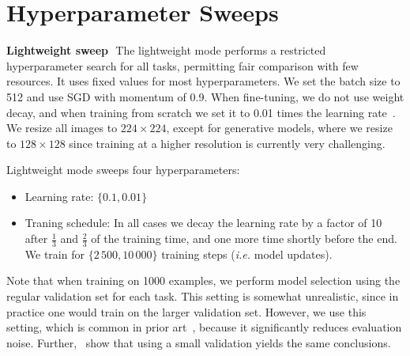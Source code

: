 \documentclass{article}
\renewcommand{\paragraph}[1]{{\bf #1}\,\,}
\begin{document}
\clearpage
\section{Hyperparameter Sweeps\label{app:hyperparameter_sweep}}

\paragraph{Lightweight sweep}
The lightweight mode performs a restricted hyperparameter search for all tasks, permitting fair comparison with few resources.
It uses fixed values for most hyperparameters.
We set the batch size to 512 and use SGD with momentum of 0.9.
When fine-tuning, we do not use weight decay, and when training from scratch we set it to 0.01 times the learning rate~\citep{loshchilov2019}.
We resize all images to $224\times224$, except for generative models, where we resize to $128\times128$ since training at a higher resolution is currently very challenging.


Lightweight mode sweeps four hyperparameters:
\begin{itemize}
  \item Learning rate: $\{0.1, 0.01\}$
  \item Traning schedule: In all cases we decay the learning rate by a factor of 10 after $\frac{1}{3}$ and $\frac{2}{3}$ of the training time, and one more time shortly before the end. We train for $\{\allowbreak2\,500, \allowbreak10\,000\}$ training steps (\emph{i.e.} model updates).
\end{itemize}

Note that when training on 1000 examples, we perform model selection using the regular validation set for each task.
This setting is somewhat unrealistic, since in practice one would train on the larger validation set.
However, we use this setting, which is common in prior art~\citep{olivier2018}, because it significantly reduces evaluation noise.
Further,~\citet{zhai2019s4l} show that using a small validation yields the same conclusions.
\end{document}
